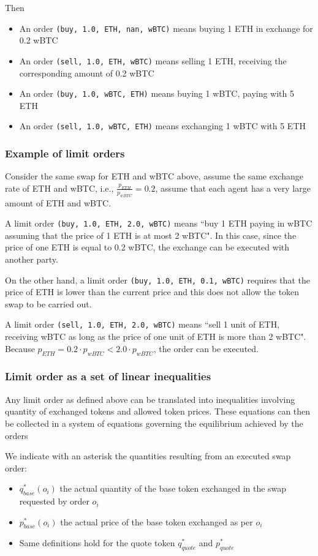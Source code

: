 \documentclass[11pt, reqno]{amsart}
\begin{document}
Then
\begin{itemize}
    \item An order \texttt{(buy, 1.0, ETH, nan, wBTC)} means buying 1 ETH in
      exchange for 0.2 wBTC
    \item An order \texttt{(sell, 1.0, ETH, wBTC)} means selling 1 ETH,
      receiving the corresponding amount of 0.2 wBTC
    \item An order \texttt{(buy, 1.0, wBTC, ETH)} means buying 1 wBTC, paying
      with 5 ETH
    \item An order \texttt{(sell, 1.0, wBTC, ETH)} means exchanging 1 wBTC with
      5 ETH
\end{itemize}

\subsubsection{Example of limit orders}
Consider the same swap for ETH and wBTC above, assume the same exchange rate
of ETH and wBTC, i.e., $\frac{p_{ETH}}{p_{wBTC}} = 0.2$, assume that each agent
has a very large amount of ETH and wBTC.

A limit order \texttt{(buy, 1.0, ETH, 2.0, wBTC)} means ``buy 1 ETH paying in wBTC
assuming that the price of 1 ETH is at most 2 wBTC". In this case, since the
price of one ETH is equal to 0.2 wBTC, the exchange can be executed with
another party.

On the other hand, a limit order \texttt{(buy, 1.0, ETH, 0.1, wBTC)} requires
that the price of ETH is lower than the current price and this does not allow
the token swap to be carried out.

A limit order \texttt{(sell, 1.0, ETH, 2.0, wBTC)} means ``sell 1 unit of ETH,
receiving wBTC as long as the price of one unit of ETH is more than 2 wBTC".
Because $p_{ETH} = 0.2 \cdot p_{wBTC} < 2.0 \cdot p_{wBTC}$, the order can be
executed.

\subsubsection{Limit order as a set of linear inequalities}
Any limit order as defined above can be translated into inequalities involving
quantity of exchanged tokens and allowed token prices. These equations can then
be collected in a system of equations governing the equilibrium achieved by the
orders

We indicate with an asterisk the quantities resulting from an executed swap
order:
\begin{itemize}
  \item $q_{base}^*(o_i)$ the actual quantity of the base token exchanged in
    the swap requested by order $o_i$
  \item $p_{base}^*(o_i)$ the actual price of the base token exchanged as per
    $o_i$
  \item Same definitions hold for the quote token $q_{quote}^*$ and $p_{quote}^*$
\end{itemize}
\end{document}
